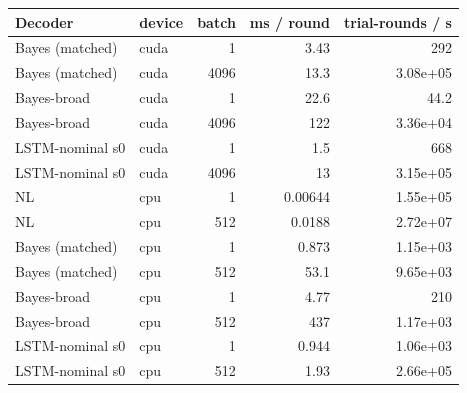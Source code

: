 \begin{tabular}{llrrr}
\toprule
Decoder & device & batch & ms / round & trial-rounds / s \\
\midrule
Bayes (matched) & cuda & 1 & 3.43 & 292 \\
Bayes (matched) & cuda & 4096 & 13.3 & 3.08e+05 \\
Bayes-broad & cuda & 1 & 22.6 & 44.2 \\
Bayes-broad & cuda & 4096 & 122 & 3.36e+04 \\
LSTM-nominal s0 & cuda & 1 & 1.5 & 668 \\
LSTM-nominal s0 & cuda & 4096 & 13 & 3.15e+05 \\
NL & cpu & 1 & 0.00644 & 1.55e+05 \\
NL & cpu & 512 & 0.0188 & 2.72e+07 \\
Bayes (matched) & cpu & 1 & 0.873 & 1.15e+03 \\
Bayes (matched) & cpu & 512 & 53.1 & 9.65e+03 \\
Bayes-broad & cpu & 1 & 4.77 & 210 \\
Bayes-broad & cpu & 512 & 437 & 1.17e+03 \\
LSTM-nominal s0 & cpu & 1 & 0.944 & 1.06e+03 \\
LSTM-nominal s0 & cpu & 512 & 1.93 & 2.66e+05 \\
\bottomrule
\end{tabular}